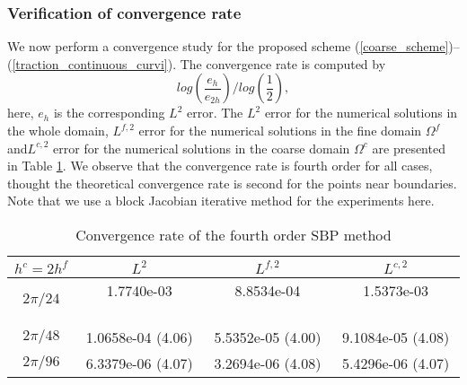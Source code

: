 \subsubsection{Verification of convergence rate}\label{convergence_study}
We now perform a convergence study for the proposed scheme (\ref{coarse_scheme})--(\ref{traction_continuous_curvi}). The convergence rate is computed by
\[log\left(\frac{e_h}{e_{2h}}\right)\Bigg/log\left(\frac{1}{2}\right),\]
here, $e_h$ is the corresponding $L^2$ error.  The $L^2$ error for the numerical solutions in the whole domain, $L^{f,2}$ error for the numerical solutions in the fine domain $\Omega^f$ and$L^{c,2}$ error for the numerical solutions in the coarse domain $\Omega^c$ are presented in Table \ref{convergence_rate}. We observe that the convergence rate is fourth order for all cases, thought the theoretical convergence rate is second for the points near boundaries. Note that we use a block Jacobian iterative method for the experiments here.

\begin{table}[htb]
	\begin{center}
		\begin{tabular}{|c|c c c|}
			\hline
			$h^c = 2h^f$   & $L^2$ & $L^{f,2}$ & $L^{c,2}$  \\
			\hline
			$2\pi/24$ &1.7740e-03 ~~~~~~~~ & 8.8534e-04 ~~~~~~~~ & 1.5373e-03 ~~~~~~~~\\
			\hline
			$2\pi/48$ &1.0658e-04 (4.06) & 5.5352e-05 (4.00) & 9.1084e-05 (4.08)\\
			\hline 
			$2\pi/96$ &6.3379e-06 (4.07) & 3.2694e-06 (4.08) & 5.4296e-06 (4.07)\\
			\hline
		\end{tabular}
	\end{center}
	\caption{Convergence rate of the fourth order SBP method}\label{convergence_rate}
\end{table} 
